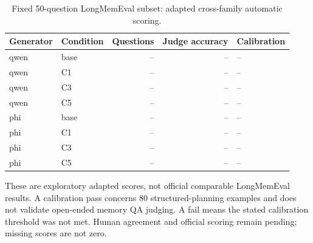 \begin{table}[ht]\centering\small
\caption{Fixed 50-question LongMemEval subset: adapted cross-family automatic scoring.}
\begin{tabular}{llrrl}\toprule
Generator & Condition & Questions & Judge accuracy & Calibration\\\midrule
qwen & base & -- & -- & --\\
qwen & C1 & -- & -- & --\\
qwen & C3 & -- & -- & --\\
qwen & C5 & -- & -- & --\\
phi & base & -- & -- & --\\
phi & C1 & -- & -- & --\\
phi & C3 & -- & -- & --\\
phi & C5 & -- & -- & --\\
\bottomrule\end{tabular}\end{table}
These are exploratory adapted scores, not official comparable LongMemEval results. A calibration pass concerns 80 structured-planning examples and does not validate open-ended memory QA judging. A fail means the stated calibration threshold was not met. Human agreement and official scoring remain pending; missing scores are not zero.
